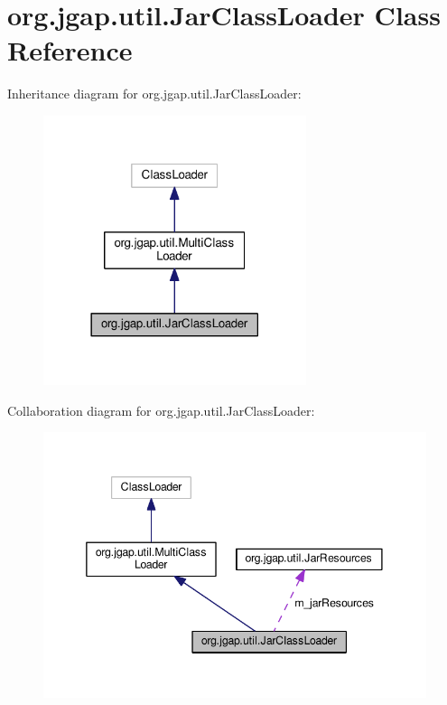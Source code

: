 \hypertarget{classorg_1_1jgap_1_1util_1_1_jar_class_loader}{\section{org.\-jgap.\-util.\-Jar\-Class\-Loader Class Reference}
\label{classorg_1_1jgap_1_1util_1_1_jar_class_loader}
}


Inheritance diagram for org.\-jgap.\-util.\-Jar\-Class\-Loader\-:
\nopagebreak
\begin{figure}[H]
\begin{center}
\leavevmode
\includegraphics[width=218pt]{classorg_1_1jgap_1_1util_1_1_jar_class_loader__inherit__graph}
\end{center}
\end{figure}


Collaboration diagram for org.\-jgap.\-util.\-Jar\-Class\-Loader\-:
\nopagebreak
\begin{figure}[H]
\begin{center}
\leavevmode
\includegraphics[width=344pt]{classorg_1_1jgap_1_1util_1_1_jar_class_loader__coll__graph}
\end{center}
\end{figure}
